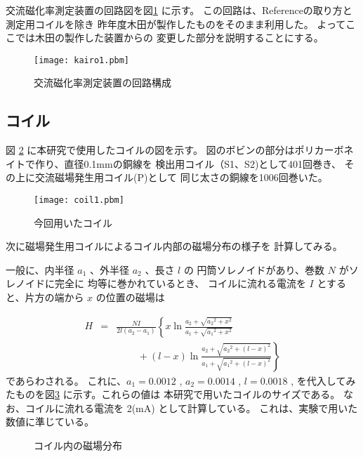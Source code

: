 交流磁化率測定装置の回路図を図\ref{fig:回路} に示す。
この回路は、Referenceの取り方と測定用コイルを除き
昨年度木田が製作したものをそのまま利用した。
よってここでは木田の製作した装置からの
変更した部分を説明することにする。

\begin{figure}[p]
\begin{center}
\texttt{[image: kairo1.pbm]}
\end{center}
\caption{交流磁化率測定装置の回路構成}
\label{fig:回路}
\end{figure}

\subsection{コイル}\label{subsec:coil}

図 \ref{fig:coil} に本研究で使用したコイルの図を示す。
図のボビンの部分はポリカーボネイトで作り、直径0.1mmの銅線を
検出用コイル（S1、S2)として401回巻き、
その上に交流磁場発生用コイル(P)として
同じ太さの銅線を1006回巻いた。

\begin{figure}[htb]
\begin{center}
\texttt{[image: coil1.pbm]}
\end{center}
\caption{今回用いたコイル}
\label{fig:coil}
\end{figure}

次に磁場発生用コイルによるコイル内部の磁場分布の様子を
計算してみる。

一般に、内半径 $a_1$ 、外半径 $a_2$ 、長さ $l$ の
円筒ソレノイドがあり、巻数 $N$ がソレノイドに完全に
均等に巻かれているとき、
コイルに流れる電流を $I$ とすると、片方の端から $x$ 
の位置の磁場は

\begin{eqnarray}
H &=& \frac{NI}{2l(a_2-a_1)}
  \left\{
  x \ln \frac{a_2+\sqrt{{a_2}^2+x^2}}{a_1+\sqrt{{a_1}^2+x^2}}
      \right. \nonumber \\
  & & \phantom{a + b} +
\left. (l-x) \ln \frac{a_2+\sqrt{{a_2}^2+(l-x)^2}}{a_1+\sqrt{{a_1}^2+(l-x)^2}}
  \right\}
\label{eq:coiljiba}
\end{eqnarray}
であらわされる。
これに、$a_1=0.0012$ , $a_2=0.0014$ , $l=0.0018$ , 
を代入してみたものを図\ref{fig:coilgraph} に示す。これらの値は
本研究で用いたコイルのサイズである。
なお、コイルに流れる電流を 2(mA) として計算している。
これは、実験で用いた数値に準じている。

\begin{figure}[htb]
\begin{center}

\end{center}
\caption{コイル内の磁場分布}
\label{fig:coilgraph}
\end{figure}

